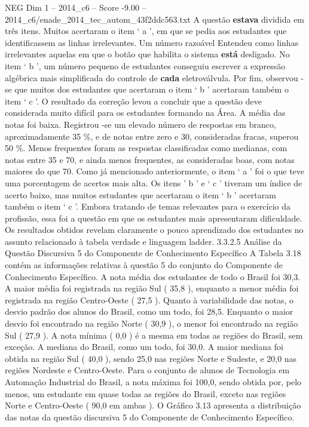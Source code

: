 \begin{textsample}{NEG Dim 1 – 2014\_c6 – Score -9.00 – 2014\_c6/enade\_2014\_tec\_autom\_43f2ddc563.txt}
A questão \textbf{estava} dividida em três itens.
Muitos acertaram o item ‘ a ’, em que se pedia aos estudantes que identificassem as linhas irrelevantes.
Um número razoável Entendeu como linhas irrelevantes aquelas em que o botão que habilita o sistema \textbf{está} desligado.
No item ‘ b ’, um número pequeno de estudantes conseguiu escrever a expressão algébrica mais simplificada do controle de \textbf{cada} eletroválvula.
Por fim, observou -se que muitos dos estudantes que acertaram o item ‘ b ’ acertaram também o item ‘ c ’.
O resultado da correção levou a concluir que a questão deve considerada muito difícil para os estudantes formando na Área.
A média das notas foi baixa.
Registrou -se um elevado número de respostas em branco, aproximadamente 35 \%, e de notas entre zero e 30, consideradas fracas, superou 50 \%.
Menos frequentes foram as respostas classificadas como medianas, com notas entre 35 e 70, e ainda menos frequentes, as consideradas boas, com notas maiores do que 70.
Como já mencionado anteriormente, o item ‘ a ’ foi o que teve uma porcentagem de acertos mais alta.
Os itens ’ b ’ e ‘ c ’ tiveram um índice de acerto baixo, mas muitos estudantes que acertaram o item ‘ b ’ acertaram também o item ‘ c ’.
Embora tratando de temas relevantes para o exercício da profissão, essa foi a questão em que os estudantes mais apresentaram dificuldade.
Os resultados obtidos revelam claramente o pouco aprendizado dos estudantes no assunto relacionado à tabela verdade e linguagem ladder. 3.3.2.5 Análise da Questão Discursiva 5 do Componente de Conhecimento Específico A Tabela 3.18 contém as informações relativas à questão 5 do conjunto do Componente de Conhecimento Específico.
A nota média dos estudantes de todo o Brasil foi 30,3.
A maior média foi registrada na região Sul ( 35,8 ), enquanto a menor média foi registrada na região Centro-Oeste ( 27,5 ).
Quanto à variabilidade das notas, o desvio padrão dos alunos do Brasil, como um todo, foi 28,5.
Enquanto o maior desvio foi encontrado na região Norte ( 30,9 ), o menor foi encontrado na região Sul ( 27,9 ).
A nota mínima ( 0,0 ) é a mesma em todas as regiões do Brasil, sem exceção.
A mediana do Brasil, como um todo, foi 30,0.
A maior mediana foi obtida na região Sul ( 40,0 ), sendo 25,0 nas regiões Norte e Sudeste, e 20,0 nas regiões Nordeste e Centro-Oeste.
Para o conjunto de alunos de Tecnologia em Automação Industrial do Brasil, a nota máxima foi 100,0, sendo obtida por, pelo menos, um estudante em quase todas as regiões do Brasil, exceto nas regiões Norte e Centro-Oeste ( 90,0 em ambas ).
O Gráfico 3.13 apresenta a distribuição das notas da questão discursiva 5 do Componente de Conhecimento Específico.

\end{textsample}
